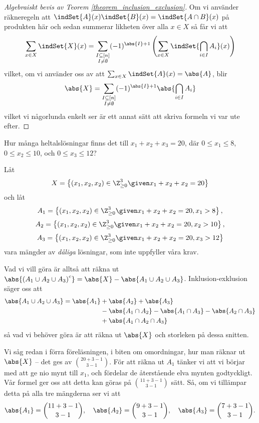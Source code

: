\documentclass[nobib]{tufte-handout}
\begin{document}
\begin{proof}[Algebraiskt bevis av Teorem \ref{theorem_inclusion_exclusion}]
  Om vi använder räkneregeln att $\indSet{A}(x)\indSet{B}(x) = \indSet{A\cap B}(x)$ på produkten här och sedan summerar likheten över alla $x\in X$ så får vi att
  $$\sum_{x\in X} \indSet{X}(x) = \sum_{\substack{I \subseteq [n]\\I \neq \emptyset}} (-1)^{\abs{I} + 1}\left(\sum_{x\in X} \indSet{\bigcap_{i\in I} A_i}(x)\right)$$
  vilket, om vi använder oss av att $\sum_{x\in X} \indSet{A}(x) = \abs{A}$, blir
  $$\abs{X} = \sum_{\substack{I \subseteq [n]\\I \neq \emptyset}} (-1)^{\abs{I} + 1}\abs{\bigcap_{i\in I} A_i}$$
  vilket vi någorlunda enkelt ser är ett annat sätt att skriva formeln vi var ute efter.
\end{proof}

\begin{example}
  Hur många heltalslösningar finns det till $x_1 + x_2 + x_3 = 20$, där $0 \leq x_1 \leq 8$, $0 \leq x_2 \leq 10$, och $0 \leq x_3 \leq 12$?

  Låt
  $$X = \left\{(x_1, x_2, x_2) \in \Z_{\geq 0}^3 \given x_1 + x_2 + x_2 = 20\right\}$$
  och låt
  $$A_1 = \left\{(x_1, x_2, x_2) \in \Z_{\geq 0}^3 \given x_1 + x_2 + x_2 = 20, x_1 > 8\right\},$$
  $$A_2 = \left\{(x_1, x_2, x_2) \in \Z_{\geq 0}^3 \given x_1 + x_2 + x_2 = 20, x_2 > 10\right\},$$
  $$A_3 = \left\{(x_1, x_2, x_2) \in \Z_{\geq 0}^3 \given x_1 + x_2 + x_2 = 20, x_3 > 12\right\}$$
  vara mängder av \emph{dåliga} lösningar, som inte uppfyller våra krav.

  Vad vi vill göra är alltså att räkna ut $\abs{\left(A_1 \cup A_2 \cup A_3\right)^c} = \abs{X} - \abs{A_1 \cup A_2 \cup A_3}$. 
  Inklusion-exklusion säger oss att
  \begin{align*}
    \abs{A_1 \cup A_2 \cup A_3} = \abs{A_1}& + \abs{A_2} + \abs{A_3}\\
    &- \abs{A_1 \cap A_2} - \abs{A_1 \cap A_3} - \abs{A_2 \cap A_3}\\
    &+ \abs{A_1 \cap A_2 \cap A_3}
  \end{align*}
  så vad vi behöver göra är att räkna ut $\abs{X}$ och storleken på dessa snitten.

  Vi såg redan i förra föreläsningen, i biten om omordningar, hur man räknar ut $\abs{X}$ -- det ges av $\binom{20+3-1}{3-1}$. För att räkna ut $A_1$ tänker vi att vi börjar med att ge nio mynt till $x_1$, och fördelar de återstående elva mynten godtyckligt. Vår formel ger oss att detta kan göras på $\binom{11+3-1}{3-1}$ sätt. Så, om vi tillämpar detta på alla tre mängderna ser vi att
  $$\abs{A_1} = \binom{11+3-1}{3-1}, \quad\abs{A_2} = \binom{9+3-1}{3-1}, \quad\abs{A_3} = \binom{7+3-1}{3-1}.$$


\end{example}
\end{document}
